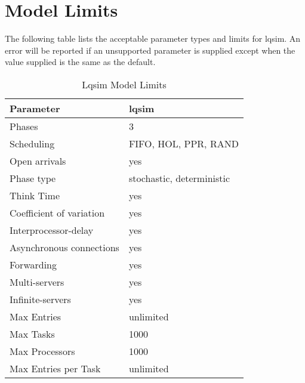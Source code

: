 \section{Model Limits}
\label{sec:lqsim-model-limits}

The following table lists the acceptable parameter types and limits
for lqsim.  An error will be reported if an unsupported parameter is
supplied except when the value supplied is the same as the default.

\begin{table}[htbp]
  \centering
  \begin{tabular}[c]{ll}
    Parameter&lqsim \\
    \hline
    Phases\index{phase!maximum} & 3 \\
    Scheduling\index{scheduling} & FIFO, HOL, PPR, RAND \\
    Open arrivals\index{open arrival} & yes \\
    Phase type\index{phase!type} & stochastic, deterministic \\
    Think Time\index{think time}  & yes  \\
    Coefficient of variation\index{coefficient of variation} & yes \\
    Interprocessor-delay\index{interprocessor delay} & yes \\
    Asynchronous connections\index{asynchronous connections} & yes \\
    Forwarding\index{forwarding} & yes \\
    Multi-servers\index{multi-server} & yes \\
    Infinite-servers\index{infinite server} & yes \\
    Max Entries\index{entry!maximum} & unlimited \\
    Max Tasks\index{task!maximum} & 1000 \\
    Max Processors\index{processor!maximum} & 1000 \\
    Max Entries per Task & unlimited \\
  \end{tabular}
  \caption{\label{tab:lqsim-model-limits}Lqsim Model Limits}
\end{table}

